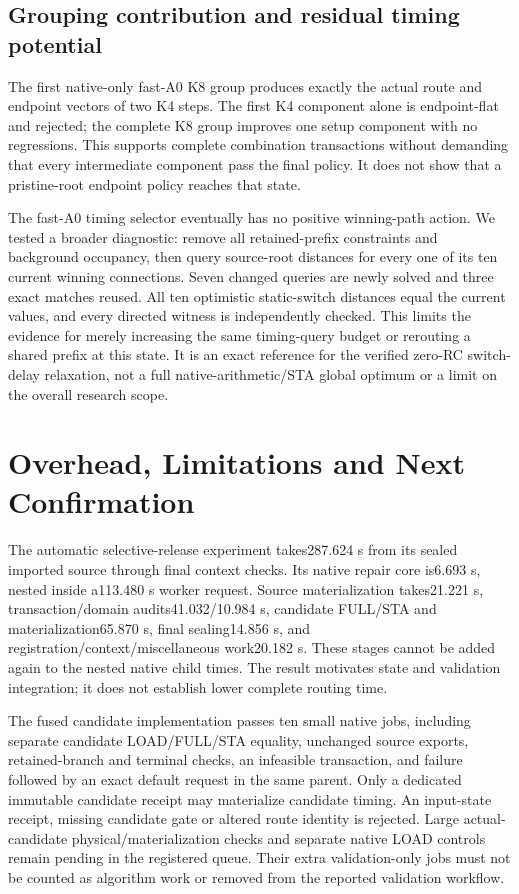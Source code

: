 \documentclass[conference,10pt]{IEEEtran}
\begin{document}
\subsection{Grouping contribution and residual timing potential}
The first native-only fast-A0 K8 group produces exactly the actual route and endpoint vectors of two K4 steps. The first K4 component alone is endpoint-flat and rejected; the complete K8 group improves one setup component with no regressions. This supports complete combination transactions without demanding that every intermediate component pass the final policy. It does not show that a pristine-root endpoint policy reaches that state.

The fast-A0 timing selector eventually has no positive winning-path action. We tested a broader diagnostic: remove all retained-prefix constraints and background occupancy, then query source-root distances for every one of its ten current winning connections. Seven changed queries are newly solved and three exact matches reused. All ten optimistic static-switch distances equal the current values, and every directed witness is independently checked. This limits the evidence for merely increasing the same timing-query budget or rerouting a shared prefix at this state. It is an exact reference for the verified zero-RC switch-delay relaxation, not a full native-arithmetic/STA global optimum or a limit on the overall research scope.

\section{Overhead, Limitations and Next Confirmation}
The automatic selective-release experiment takes287.624 s from its sealed imported source through final context checks. Its native repair core is6.693 s, nested inside a113.480 s worker request. Source materialization takes21.221 s, transaction/domain audits41.032/10.984 s, candidate FULL/STA and materialization65.870 s, final sealing14.856 s, and registration/context/miscellaneous work20.182 s. These stages cannot be added again to the nested native child times. The result motivates state and validation integration; it does not establish lower complete routing time.

The fused candidate implementation passes ten small native jobs, including separate candidate LOAD/FULL/STA equality, unchanged source exports, retained-branch and terminal checks, an infeasible transaction, and failure followed by an exact default request in the same parent. Only a dedicated immutable candidate receipt may materialize candidate timing. An input-state receipt, missing candidate gate or altered route identity is rejected. Large actual-candidate physical/materialization checks and separate native LOAD controls remain pending in the registered queue. Their extra validation-only jobs must not be counted as algorithm work or removed from the reported validation workflow.
\end{document}
